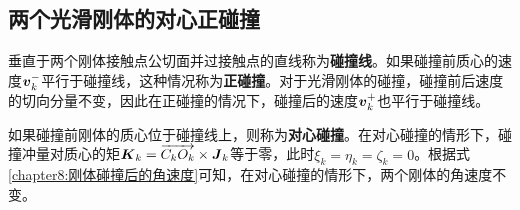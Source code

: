 \subsection{两个光滑刚体的对心正碰撞}

垂直于两个刚体接触点公切面并过接触点的直线称为{\bf 碰撞线}。如果碰撞前质心的速度$\boldsymbol{v}_k^-$平行于碰撞线，这种情况称为{\bf 正碰撞}。对于光滑刚体的碰撞，碰撞前后速度的切向分量不变，因此在正碰撞的情况下，碰撞后的速度$\boldsymbol{v}_k^+$也平行于碰撞线。

如果碰撞前刚体的质心位于碰撞线上，则称为{\bf 对心碰撞}。在对心碰撞的情形下，碰撞冲量对质心的矩$\boldsymbol{K}_k=\overrightarrow{C_kO_k}\times \boldsymbol{J}_k$等于零，此时$\xi_k=\eta_k=\zeta_k=0$。根据式\eqref{chapter8:刚体碰撞后的角速度}可知，在对心碰撞的情形下，两个刚体的角速度不变。